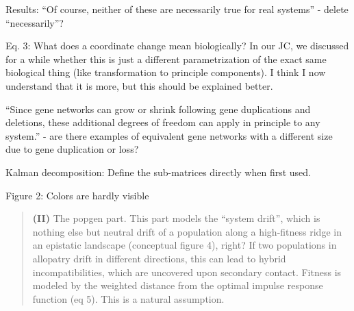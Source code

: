 \reply{
}

\begin{point}{Results:}
    ``Of course, neither of these are necessarily true for real systems'' - delete ``necessarily''?
\end{point}


\begin{point}{Eq. 3:}
    What does a coordinate change mean biologically? In our JC, we discussed for a while whether this is just a different parametrization of the exact same biological thing (like transformation to principle components). I think I now understand that it is more, but this should be explained better.
\end{point}


\begin{point}{}
    ``Since gene networks can grow or shrink following gene duplications and deletions,
these additional degrees of freedom can apply in principle to any system.'' - are there examples of equivalent gene networks with a different size due to gene duplication or loss?
\end{point}

\reply{
}

\begin{point}{Kalman decomposition:}
    Define the sub-matrices directly when first used.
\end{point}


\begin{point}{Figure 2:}
    Colors are hardly visible
\end{point}

\reply{
}

\begin{quote}
    \textbf{(II)} The popgen part. This part models the ``system drift'', which is nothing else
but neutral drift of a population along a high-fitness ridge in an epistatic
landscape (conceptual figure 4), right? If two populations in allopatry drift
in different directions, this can lead to hybrid incompatibilities, which are
uncovered upon secondary contact. Fitness is modeled by the weighted distance
from the optimal impulse response function (eq 5). This is a natural
assumption.
\end{quote}

